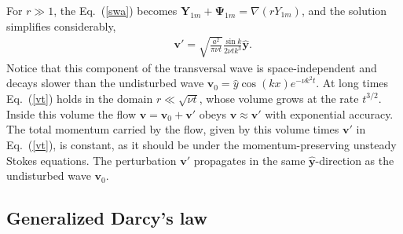\documentclass[aps,prx,twocolumn,amsmath,amssymb,amsfonts]{revtex4-2}
\begin{document}
For $r\!\gg\! 1$, the Eq.~(\ref{swa}) becomes $\bm Y_{1m}+\bm \Psi_{1m}=\nabla(rY_{1m})$, and the solution simplifies considerably,
\begin{eqnarray}&&\!\!\!\!\!\!
\bm v'=\sqrt{\frac{a^2}{\pi \nu t}}\frac{\sin k}{2\nu t k^3}\bm{\hat y}. \label{vt}
\end{eqnarray}
Notice that this component of the transversal wave is space-independent and decays slower than the undisturbed wave $\bm v_0={\hat y}\cos(kx)e^{-\nu k^2 t}$. At long times Eq.~(\ref{vt}) holds in the domain $r\!\ll\! \sqrt{\nu t}$, whose volume grows at the rate $t^{3/2}$. Inside this volume the flow $\bm v=\bm v_0+\bm v'$ obeys $\bm v\approx \bm v'$ with exponential accuracy. The total momentum carried by the flow, given by this volume times $\bm v'$ in Eq.~(\ref{vt}), is constant, as it should be under the momentum-preserving unsteady Stokes equations. The perturbation $\bm v'$ propagates in the same $\bm{\hat y}$-direction as the undisturbed wave $\bm v_0$.

\subsection{Generalized Darcy's law}
\end{document}
